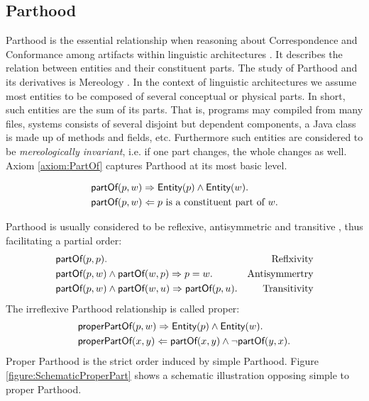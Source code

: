 \subsection{Parthood}
\label{subsection:Parthood}
\Gls{Parthood} is the essential relationship when reasoning about \gls{Correspondence} and \gls{Conformance} among artifacts within linguistic architectures \cite{DBLP:conf/sle/Lammel16} \cite{HeinzLV17}.
It describes the relation between entities and their constituent parts.
The study of \gls{Parthood} and its derivatives is \gls{Mereology} \cite{DBLP:journals/dke/Varzi96} \cite{SEP:Mereology}.
In the context of linguistic architectures we assume most entities to be
composed of several conceptual or physical parts.
In short, such entities are the sum of its parts.
That is, programs may compiled from many files, systems consists of several disjoint but dependent components, a \gls{Java} class is made up of methods and fields, etc.
Furthermore such entities are considered to be \textit{mereologically invariant}, i.e. if one part changes, the whole changes as well. 
Axiom \ref{axiom:PartOf} captures \gls{Parthood} at its most basic level.
\begin{axiom}[\partOf]
\label{axiom:PartOf}
\begin{align*}
&\textsf{partOf}(p,w)
\Rightarrow
\textsf{Entity}(p) \wedge \textsf{Entity}(w).\\
&\textsf{partOf}(p,w)
\Leftarrow
p \text{ is a constituent part of } w.
\end{align*}
\end{axiom}
\Gls{Parthood} is usually considered to be reflexive, antisymmetric and transitive \cite{DBLP:journals/dke/Varzi96} \cite{SEP:Mereology}, thus facilitating a partial order:
\begin{align*}
&\textsf{partOf}(p,p). &\text{Reflxivity}\\
&\textsf{partOf}(p,w) \wedge \textsf{partOf}(w,p)
\Rightarrow
p = w. &\text{Antisymmertry}\\
&\textsf{partOf}(p,w) \wedge \textsf{partOf}(w,u)
\Rightarrow 
\textsf{partOf}(p,u). &\text{Transitivity}
\end{align*}
The irreflexive \gls{Parthood} relationship is called proper:
\begin{align*}
&\textsf{properPartOf}(p,w)
\Rightarrow
\textsf{Entity}(p) \wedge \textsf{Entity}(w).\\
&\textsf{properPartOf}(x,y)
\Leftarrow
\textsf{partOf}(x,y) \wedge \neg \textsf{partOf}(y,x).
\end{align*}
Proper \gls{Parthood} is the strict order induced by simple \gls{Parthood}.
Figure \ref{figure:SchematicProperPart} shows a schematic illustration opposing simple to proper \gls{Parthood}.
